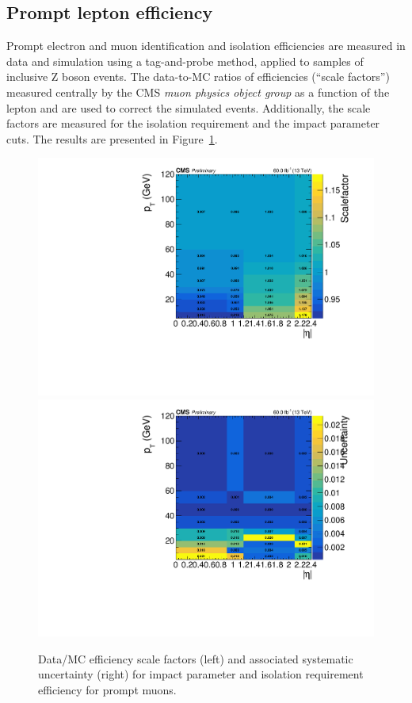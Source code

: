 \subsection{Prompt lepton efficiency} \label{sec:promptleptoneff}
Prompt electron and muon identification and isolation efficiencies
are measured in data and simulation using a tag-and-probe method,
applied to samples of inclusive Z boson events.
The data-to-MC ratios of efficiencies (``scale factors'')
measured centrally by the CMS \emph{muon physics object group} as a
function of the lepton \pt and \sigeta are
used to correct the simulated events. Additionally, the scale factors
are measured for the isolation requirement and the impact
parameter cuts. The results are presented in
Figure~\ref{fig:isoip_muon_prompt}.
\begin{figure}[h]
\centering
  \includegraphics[width=.45\textwidth]{Figures/c6/efficiencies/muons/2018/isoip_prompt_sf_2018.pdf}
  \includegraphics[width=.45\textwidth]{Figures/c6/efficiencies/muons/2018/isoip_prompt_syst_2018.pdf}
  \caption{Data/MC efficiency scale factors (left) and associated
  systematic uncertainty (right) for impact parameter and isolation requirement efficiency
  for prompt muons.}
  \label{fig:isoip_muon_prompt}
\end{figure}

